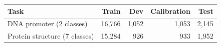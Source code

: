 \begin{tabular}{lrrrr}
\toprule
Task & Train & Dev & Calibration & Test \\
\midrule
DNA promoter (2 classes) & 16,766 & 1,052 & 1,053 & 2,145 \\
Protein structure (7 classes) & 15,284 & 926 & 933 & 1,952 \\
\bottomrule
\end{tabular}
